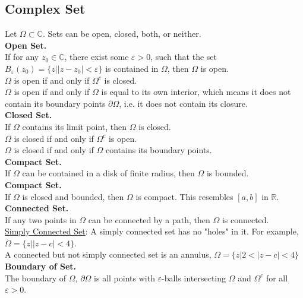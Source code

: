 \documentclass[11pt]{article}
\begin{document}
\subsection{Complex Set} 
Let $\Omega \subset \mathbb{C}$. Sets can be open, closed, both, or neither. \\
\newline
\textbf{Open Set.} \\ 
If for any $z_0 \in \mathbb{C}$, there exist some $\varepsilon > 0$, such that the set $B_\varepsilon(z_0) = \{z||z - z_0| < \varepsilon\}$ is contained in $\Omega$, then $\Omega$ is open. \\
$\Omega$ is open if and only if $\Omega^c$ is closed. \\ 
$\Omega$ is open if and only if $\Omega$ is equal to its own interior, which means it does not contain its boundary points $\partial \Omega$, i.e. it does not contain its closure. \\
\newline
\textbf{Closed Set.} \\ 
If $\Omega$ contains its limit point, then $\Omega$ is closed. \\
$\Omega$ is closed if and only if $\Omega^c$ is open. \\ 
$\Omega$ is closed if and only if $\Omega$ contains its boundary points. \\
\newline
\textbf{Compact Set.}\\ 
If $\Omega$ can be contained in a disk of finite radius, then $\Omega$ is bounded. \\
\newline
\textbf{Compact Set.} \\ 
If $\Omega$ is closed and bounded, then $\Omega$ is compact. This resembles $[a, b]$ in $\mathbb{R}$. \\
\newline
\textbf{Connected Set.}\\ 
If any two points in $\Omega$ can be connected by a path, then $\Omega$ is connected. \\
\underline{Simply Connected Set}: A simply connected set has no "holes" in it. For example, $\Omega = \{z||z - c|<4\}$. \\
A connected but not simply connected set is an annulus, $\Omega = \{z|2< |z - c|<4\}$ \\
\newline
\textbf{Boundary of Set.}\\
The boundary of $\Omega$, $\partial \Omega$ is all points with $\varepsilon$-balls intersecting $\Omega$ and $\Omega^c$ for all $\varepsilon > 0$. \\
\end{document}

